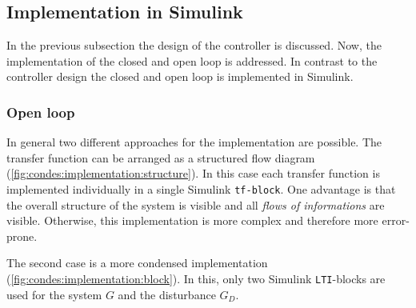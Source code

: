 \subsection{Implementation in Simulink} \label{sec:condes:implementation_simulink}

In the previous subsection the design of the controller is discussed.
Now, the implementation of the closed and open loop is addressed.
In contrast to the controller design the closed and open loop is implemented in Simulink.

\subsubsection*{Open loop} \label{sec:condes:implementation_simulink:open_loop}

In general two different approaches for the implementation are possible.
The transfer function can be arranged as a structured flow diagram (\autoref{fig:condes:implementation:structure}).
In this case each transfer function is implemented individually in a single Simulink \texttt{tf-block}.
One advantage is that the overall structure of the system is visible and all \textit{flows of informations} are visible.
Otherwise, this implementation is more complex and therefore more error-prone.

The second case is a more condensed implementation (\autoref{fig:condes:implementation:block}).
In this, only two Simulink \texttt{LTI}-blocks are used for the system $G$ and the disturbance $G_D$.

